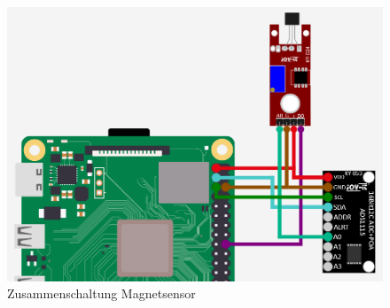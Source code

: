 \begin{figure}[H]
    \centering
    \includegraphics[scale=0.6]{image/zusammenmanet.png}
    \caption{Zusammenschaltung Magnetsensor\autocite{Zusammenschaltungmagnet}}
    \label{fig:enter-label}
\end{figure}